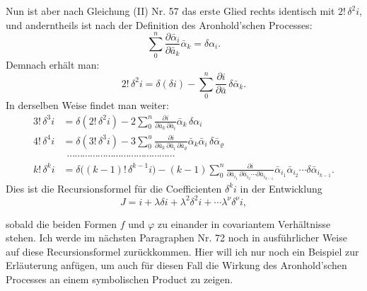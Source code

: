 Nun ist aber nach Gleichung (II) Nr. 57 das erste Glied rechts identisch mit $2!\,\delta^2 i$, und anderntheils ist nach der Definition des Aronhold'schen Processes:
\[
\sum_0^n \frac{\partial \bar\alpha_i}{\partial \bar a_k}\bar\alpha_k = \delta\alpha_i.
\]
Demnach erhält man:
\[
2!\,\delta^2 i = \delta(\delta i) - \sum_0^n \frac{\partial i}{\partial \bar a}\,\delta\bar\alpha_k.
\]
In derselben Weise findet man weiter:
\[
\begin{aligned}
3!\,\delta^3 i &= \delta(2!\,\delta^2 i) - 2\sum_0^n \frac{\partial i}{\partial \bar a_k\,\partial \bar a_i}\bar\alpha_k\,\delta\alpha_i\\
4!\,\delta^4 i &= \delta(3!\,\delta^3 i) - 3\sum_0^u \frac{\partial i}{\partial \bar a_k\,\partial \bar a_i\,\partial \bar a_\varrho}\bar\alpha_k\bar\alpha_i\,\delta\bar\alpha_\varrho\\
&\ \ \cdots\cdots\cdots\cdots\cdots\cdots\cdots\cdots\cdots\cdots\cdots\cdots\cdots\cdots\\
k!\,\delta^k i &= \delta\big((k-1)!\,\delta^{k-1}i\big) - (k-1)\sum_0^n \frac{\partial i}{\partial \bar a_{i_1}\,\partial \bar a_{i_2}\cdots \partial \bar a_{i_{k-1}}}\bar\alpha_{i_1}\bar\alpha_{i_2}\cdots \delta\bar\alpha_{i_{k-1}}.
\end{aligned}
\]
Dies ist die Recursionsformel für die Coefficienten $\delta^k i$ in der Entwicklung
\[
J = i + \lambda\delta i + \lambda^2\delta^2 i + \cdots \lambda^\nu \delta^\nu i,
\]


sobald die beiden Formen $f$ und $\varphi$ zu einander in covariantem Verhältnisse stehen. Ich werde im nächsten Paragraphen Nr. 72 noch in ausführlicher Weise auf diese Recursionsformel zurückkommen. Hier will ich nur noch ein Beispiel zur Erläuterung anfügen, um auch für diesen Fall die Wirkung des Aronhold'schen Processes an einem symbolischen Product zu zeigen.

